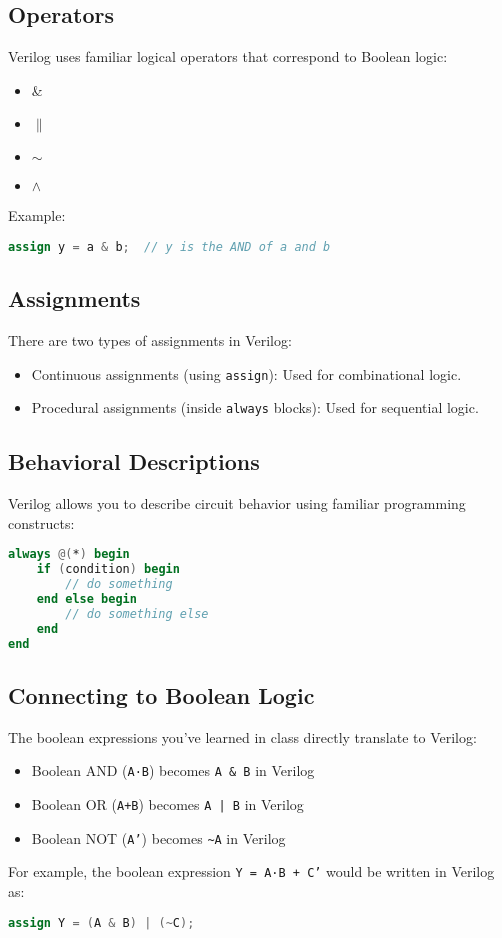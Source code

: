 \documentclass[12pt]{journal}
\begin{document}
\subsection{Operators}

Verilog uses familiar logical operators that correspond to Boolean logic:

\begin{itemize}
  \item {} \& 
  \item {} $\|$
  \item {} $\sim $
  \item {} $\wedge$
\end{itemize}

Example: \begin{lstlisting}[language=verilog]
assign y = a & b;  // y is the AND of a and b
\end{lstlisting}


\subsection{Assignments}
There are two types of assignments in Verilog:
\begin{itemize}
  \item Continuous assignments (using \texttt{assign}): Used for combinational logic.
  \item Procedural assignments (inside \texttt{always} blocks): Used for sequential logic.
\end{itemize}

\subsection{Behavioral Descriptions}
Verilog allows you to describe circuit behavior using familiar programming constructs:
\begin{lstlisting}[language=verilog]    
always @(*) begin
    if (condition) begin
        // do something
    end else begin
        // do something else
    end
end
\end{lstlisting}

\subsection{Connecting to Boolean Logic}
The boolean expressions you've learned in class directly translate to Verilog:
\begin{itemize}
  \item Boolean AND (\texttt{A·B}) becomes \texttt{A \& B} in Verilog
  \item Boolean OR (\texttt{A+B}) becomes \texttt{A | B} in Verilog
  \item Boolean NOT (\texttt{A'}) becomes \texttt{\textasciitilde A} in Verilog
\end{itemize}
For example, the boolean expression \texttt{Y = A·B + C'} would be written in Verilog as:
\begin{lstlisting}[language=verilog]
assign Y = (A & B) | (~C);
\end{lstlisting}
\end{document}
